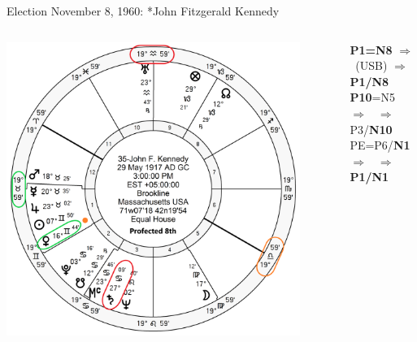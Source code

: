 \begin{frame}[t]{Election November 8, 1960: *John Fitzgerald Kennedy}
\begin{columns}[T, onlytextwidth]
\vspace{-1em}
{\includegraphics[width=0.9\textwidth]{charts/JFK-Prof-8th.png}}
\fontsize{7pt}{8pt}\selectfont

\textbf{\dgreen P1=N8}
	$\Rightarrow$ \Venus\, (USB) $\Rightarrow$ \textbf{\dgreen P1/N8} \\
\textbf{\red P10}=N5
	$\Rightarrow$  \Saturn\, $\Rightarrow$ P3/\textbf{\red N10} \\
PE=P6/\textbf{\dgreen N1}
	$\Rightarrow$  \Venus\, $\Rightarrow$   \textbf{\dgreen P1/N1}


\end{columns}
\end{frame}

